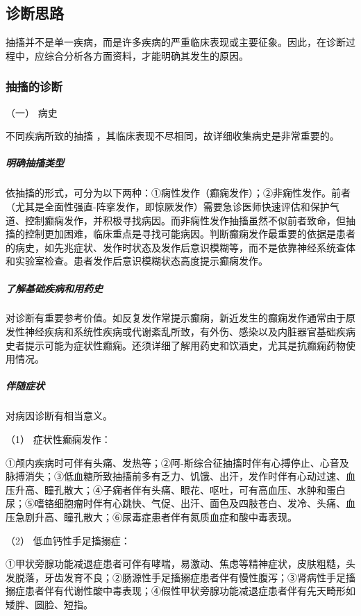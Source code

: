 \subsection{诊断思路}

抽搐并不是单一疾病，而是许多疾病的严重临床表现或主要征象。因此，在诊断过程中，应综合分析各方面资料，才能明确其发生的原因。

\subsubsection{抽搐的诊断}

\hypertarget{text00016.htmlux5cux23CHP1-5-2-1-1}{}
（一） 病史

不同疾病所致的抽搐 ，其临床表现不尽相同，故详细收集病史是非常重要的。

\subparagraph{明确抽搐类型}

依抽搐的形式，可分为以下两种：①痫性发作（癫痫发作）；②非痫性发作。前者（尤其是全面性强直-阵挛发作，即惊厥发作）需要急诊医师快速评估和保护气道、控制癫痫发作，并积极寻找病因。而非痫性发作抽搐虽然不似前者致命，但抽搐的控制更加困难，临床重点是寻找可能病因。判断癫痫发作最重要的依据是患者的病史，如先兆症状、发作时状态及发作后意识模糊等，而不是依靠神经系统查体和实验室检查。患者发作后意识模糊状态高度提示癫痫发作。

\subparagraph{了解基础疾病和用药史}

对诊断有重要参考价值。如反复发作常提示癫痫，新近发生的癫痫发作通常由于原发性神经疾病和系统性疾病或代谢紊乱所致，有外伤、感染以及内脏器官基础疾病史者提示可能为症状性癫痫。还须详细了解用药史和饮酒史，尤其是抗癫痫药物使用情况。

\subparagraph{伴随症状}

对病因诊断有相当意义。

\hypertarget{text00016.htmlux5cux23CHP1-5-2-1-1-3-1}{}
（1） 症状性癫痫发作：

①颅内疾病时可伴有头痛、发热等；②阿-斯综合征抽搐时伴有心搏停止、心音及脉搏消失；③低血糖所致抽搐前多有乏力、饥饿、出汗，发作时伴有心动过速、血压升高、瞳孔散大；④子痫者伴有头痛、眼花、呕吐，可有高血压、水肿和蛋白尿；⑤嗜铬细胞瘤时伴有心跳快、气促、出汗、面色及四肢苍白、发冷、头痛、血压急剧升高、瞳孔散大；⑥尿毒症患者伴有氮质血症和酸中毒表现。

\hypertarget{text00016.htmlux5cux23CHP1-5-2-1-1-3-2}{}
（2） 低血钙性手足搐搦症：

①甲状旁腺功能减退症患者可伴有哮喘，易激动、焦虑等精神症状，皮肤粗糙，头发脱落，牙齿发育不良；②肠源性手足搐搦症患者伴有慢性腹泻；③肾病性手足搐搦症患者伴有代谢性酸中毒表现；④假性甲状旁腺功能减退症患者伴有先天畸形如矮胖、圆脸、短指。

